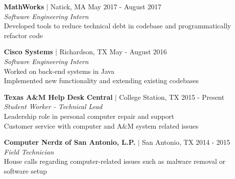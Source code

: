 \documentclass[12pt]{article}
\begin{document}
\begin{flushleft}
\begin{outline}[compactitem]

  \1 \textbf{MathWorks} $|$ Natick, MA \hfill May 2017 - August 2017
    \\ \textit{Software Engineering Intern}
    \\ Developed tools to reduce technical debt in codebase and programmatically refactor code

  \1 \textbf{Cisco Systems} $|$ Richardson, TX \hfill May - August 2016
    \\ \textit{Software Engineering Intern}
    \\ Worked on back-end systems in Java
    \\ Implemented new functionality and extending existing codebases

  \1 \textbf{Texas A\&M Help Desk Central} $|$ College Station, TX \hfill 2015 - Present
    \\ \textit{Student Worker - Technical Lead}
    \\ Leadership role in personal computer repair and support
    \\ Customer service with  computer and A\&M system related issues

  \1 \textbf{Computer Nerdz of San Antonio, L.P.} $|$ San Antonio, TX \hfill 2014 - 2015
    \\ \textit{Field Technician}
    \\ House calls regarding computer-related issues such as malware removal or software setup





\end{outline}
\end{flushleft}
\end{document}
